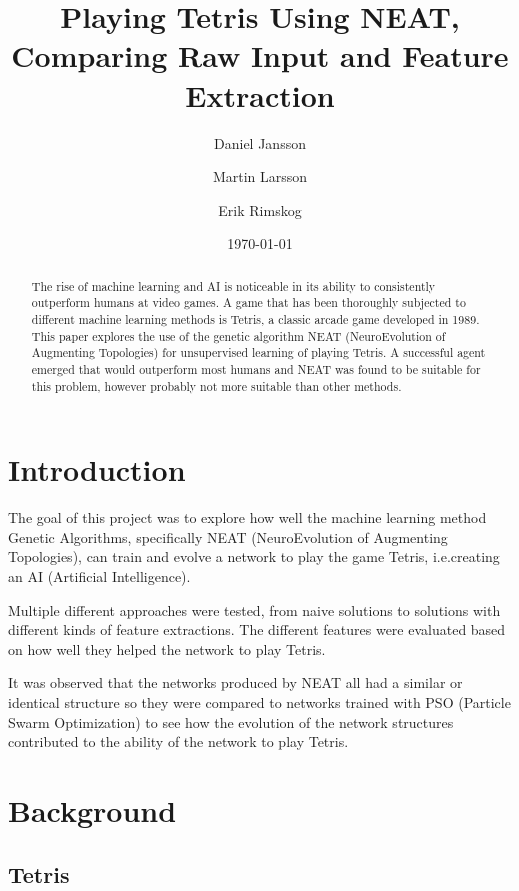 \documentclass{article}
\title{Playing Tetris Using NEAT, Comparing Raw Input and Feature Extraction}
\author{Daniel Jansson \and Martin Larsson \and Erik Rimskog}
\date{\today}
\begin{document}
\maketitle

\begin{abstract}
The rise of machine learning and AI is noticeable in its ability to consistently outperform humans at video games. A game that has been thoroughly subjected to different machine learning methods is Tetris, a classic arcade game developed in 1989. This paper explores the use of the genetic algorithm NEAT (NeuroEvolution of Augmenting Topologies) for unsupervised learning of playing Tetris. A successful agent emerged that would outperform most humans and NEAT was found to be suitable for this problem, however probably not more suitable than other methods.
\end{abstract}
\newpage
\tableofcontents
\newpage

\section{Introduction}

The goal of this project was to explore how well the machine learning method Genetic Algorithms\cite{GA}, specifically NEAT (NeuroEvolution of Augmenting Topologies)\cite{NEAT}, can train and evolve a network to play the game Tetris, i.e.\@ creating an AI (Artificial Intelligence).

Multiple different approaches were tested, from naive solutions to solutions with different kinds of feature extractions. The different features were evaluated based on how well they helped the network to play Tetris.

It was observed that the networks produced by NEAT all had a similar or identical structure so they were compared to networks trained with PSO (Particle Swarm Optimization)\cite{PSO} to see how the evolution of the network structures contributed to the ability of the network to play Tetris. 

\section{Background}
\subsection{Tetris}
\end{document}
